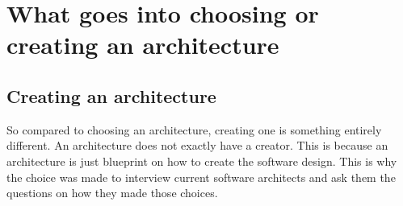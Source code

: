 \section{What goes into choosing or creating an architecture}

\subsection{Creating an architecture}

So compared to choosing an architecture, creating one is something entirely different. An architecture does not exactly have a creator. This is because an architecture is just blueprint on how to create the software design. This is why the choice was made to interview current software architects and ask them the questions on how they made those choices.
